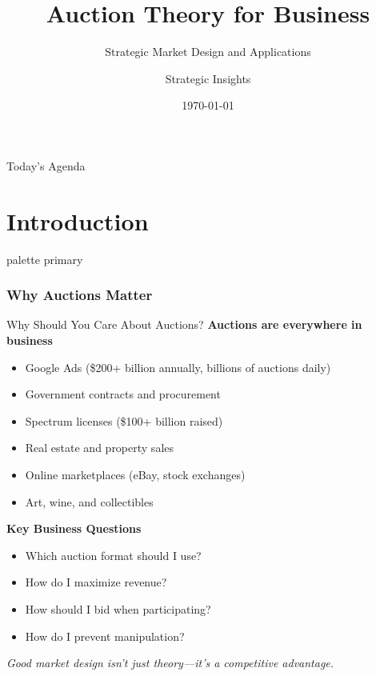 \documentclass[xcolor={x11names}, aspectratio=169 ]{beamer}
\title{Auction Theory for Business}
\subtitle{Strategic Market Design and Applications}
\author{Strategic Insights}
\date{\today}
\newcommand{\partslide}{%
  \begin{frame}
    \vfill
    \centering
    \begin{beamercolorbox}[sep=12pt,center,shadow=true,rounded=true]{palette primary}
      \usebeamerfont{title}\Large\insertpart\par%
    \end{beamercolorbox}
    \vfill
  \end{frame}
}
\begin{document}
\begin{frame}
  \titlepage
\end{frame}

\begin{frame}{Today's Agenda}
  \tableofcontents[hideallsubsections]
\end{frame}

\part{Introduction}
\partslide
\section{Why Auctions Matter}

\begin{frame}{Why Should You Care About Auctions?}
\textbf{Auctions are everywhere in business}
\begin{itemize}
  \item Google Ads (\$200+ billion annually, billions of auctions daily)
  \item Government contracts and procurement
  \item Spectrum licenses (\$100+ billion raised)
  \item Real estate and property sales
  \item Online marketplaces (eBay, stock exchanges)
  \item Art, wine, and collectibles
\end{itemize}

\vspace{0.3cm}
\textbf{Key Business Questions}
\begin{itemize}
  \item Which auction format should I use?
  \item How do I maximize revenue?
  \item How should I bid when participating?
  \item How do I prevent manipulation?
\end{itemize}

\vspace{0.2cm}
\textit{Good market design isn't just theory---it's a competitive advantage.}
\end{frame}
\end{document}
